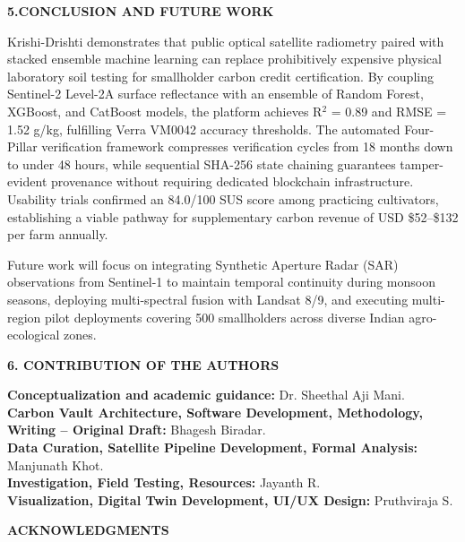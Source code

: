 \documentclass[11pt,a4paper]{article}
\begin{document}
\noindent \textbf{\large 5.CONCLUSION AND FUTURE WORK}
\vspace{0.5em}

\noindent Krishi-Drishti demonstrates that public optical satellite radiometry paired with stacked ensemble machine learning can replace prohibitively expensive physical laboratory soil testing for smallholder carbon credit certification. By coupling Sentinel-2 Level-2A surface reflectance with an ensemble of Random Forest, XGBoost, and CatBoost models, the platform achieves R$^2$ = 0.89 and RMSE = 1.52 g/kg, fulfilling Verra VM0042 accuracy thresholds. The automated Four-Pillar verification framework compresses verification cycles from 18 months down to under 48 hours, while sequential SHA-256 state chaining guarantees tamper-evident provenance without requiring dedicated blockchain infrastructure. Usability trials confirmed an 84.0/100 SUS score among practicing cultivators, establishing a viable pathway for supplementary carbon revenue of USD \$52--\$132 per farm annually.

Future work will focus on integrating Synthetic Aperture Radar (SAR) observations from Sentinel-1 to maintain temporal continuity during monsoon seasons, deploying multi-spectral fusion with Landsat 8/9, and executing multi-region pilot deployments covering 500 smallholders across diverse Indian agro-ecological zones.
\vspace{1.2em}

\noindent \textbf{\large 6. CONTRIBUTION OF THE AUTHORS}
\vspace{0.5em}

\noindent \textbf{Conceptualization and academic guidance:} Dr. Sheethal Aji Mani. \\
\textbf{Carbon Vault Architecture, Software Development, Methodology, Writing -- Original Draft:} Bhagesh Biradar. \\
\textbf{Data Curation, Satellite Pipeline Development, Formal Analysis:} Manjunath Khot. \\
\textbf{Investigation, Field Testing, Resources:} Jayanth R. \\
\textbf{Visualization, Digital Twin Development, UI/UX Design:} Pruthviraja S.
\vspace{1.2em}

\noindent \textbf{\large ACKNOWLEDGMENTS}
\vspace{0.5em}
\end{document}
